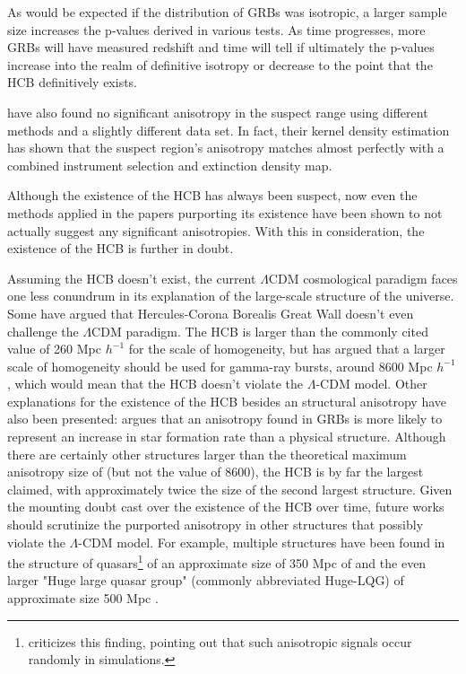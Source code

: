 \documentclass[fleqn,usenatbib]{mnras}
\begin{document}
As would be expected if the distribution of GRBs was isotropic, a larger sample size increases the p-values derived in various tests. As time progresses, more GRBs will have measured redshift and time will tell if ultimately the p-values increase into the realm of definitive isotropy or decrease to the point that the HCB definitively exists.

\citet{ukwatta2016} have also found no significant anisotropy in the suspect range using different methods and a slightly different data set. In fact, their kernel density estimation has shown that the suspect region's anisotropy matches almost perfectly with a combined instrument selection and extinction density map.

Although the existence of the HCB has always been suspect, now even the methods applied in the papers purporting its existence have been shown to not actually suggest any significant anisotropies. With this in consideration, the existence of the HCB is further in doubt.

Assuming the HCB doesn't exist, the current $\Lambda$CDM cosmological paradigm faces one less conundrum in its explanation of the large-scale structure of the universe. Some have argued that Hercules-Corona Borealis Great Wall doesn't even challenge the $\Lambda$CDM paradigm. The HCB is larger than the commonly cited \citet{yadav2010} value of 260 Mpc $h^{-1}$ for the scale of homogeneity, but \citet{li2015} has argued that a larger scale of homogeneity should be used for gamma-ray bursts, around 8600 Mpc $h^{-1}$, which would mean that the HCB doesn't violate the $\Lambda$-CDM model. Other explanations for the existence of the HCB besides an structural anisotropy have also been presented: \citet{balazas2018} argues that an anisotropy found in GRBs is more likely to represent an increase in star formation rate than a physical structure. Although there are certainly other structures larger than the theoretical maximum anisotropy size of \citet{yadav2010} (but not the \citet{li2015} value of 8600), the HCB is by far the largest claimed, with approximately twice the size of the second largest structure. Given the mounting doubt cast over the existence of the HCB over time, future works should scrutinize the purported anisotropy in other structures that possibly violate the $\Lambda$-CDM model. For example, multiple structures have been found in the structure of quasars\footnote{\citet{Nadathur2013} criticizes this finding, pointing out that such anisotropic signals occur randomly in simulations.} of an approximate size of 350 Mpc of \citet{clowes2011} and the even larger "Huge large quasar group" (commonly abbreviated Huge-LQG) of approximate size 500 Mpc \citep{Clowes2013}.
\end{document}
